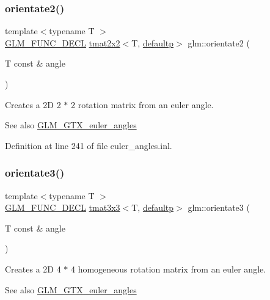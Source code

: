 \subsubsection{\texorpdfstring{orientate2()}{orientate2()}}
{\footnotesize\ttfamily template$<$typename T $>$ \\
\mbox{\hyperlink{setup_8hpp_ab2d052de21a70539923e9bcbf6e83a51}{G\+L\+M\+\_\+\+F\+U\+N\+C\+\_\+\+D\+E\+CL}} \mbox{\hyperlink{structglm_1_1tmat2x2}{tmat2x2}}$<$T, \mbox{\hyperlink{namespaceglm_a0f04f086094c747d227af4425893f545a9d21ccd8b5a009ec7eb7677befc3bf51}{defaultp}}$>$ glm\+::orientate2 (\begin{DoxyParamCaption}\item[{T const \&}]{angle }\end{DoxyParamCaption})}

Creates a 2D 2 $\ast$ 2 rotation matrix from an euler angle. \begin{DoxySeeAlso}{See also}
\mbox{\hyperlink{group__gtx__euler__angles}{G\+L\+M\+\_\+\+G\+T\+X\+\_\+euler\+\_\+angles}} 
\end{DoxySeeAlso}


Definition at line 241 of file euler\+\_\+angles.\+inl.

\mbox{\label{group__gtx__euler__angles_gab188e2526dea3c003e86e298f618085e}} 
\subsubsection{\texorpdfstring{orientate3()}{orientate3()}\hspace{0.1cm}{\footnotesize\ttfamily [1/2]}}
{\footnotesize\ttfamily template$<$typename T $>$ \\
\mbox{\hyperlink{setup_8hpp_ab2d052de21a70539923e9bcbf6e83a51}{G\+L\+M\+\_\+\+F\+U\+N\+C\+\_\+\+D\+E\+CL}} \mbox{\hyperlink{structglm_1_1tmat3x3}{tmat3x3}}$<$T, \mbox{\hyperlink{namespaceglm_a0f04f086094c747d227af4425893f545a9d21ccd8b5a009ec7eb7677befc3bf51}{defaultp}}$>$ glm\+::orientate3 (\begin{DoxyParamCaption}\item[{T const \&}]{angle }\end{DoxyParamCaption})}

Creates a 2D 4 $\ast$ 4 homogeneous rotation matrix from an euler angle. \begin{DoxySeeAlso}{See also}
\mbox{\hyperlink{group__gtx__euler__angles}{G\+L\+M\+\_\+\+G\+T\+X\+\_\+euler\+\_\+angles}} 
\end{DoxySeeAlso}


